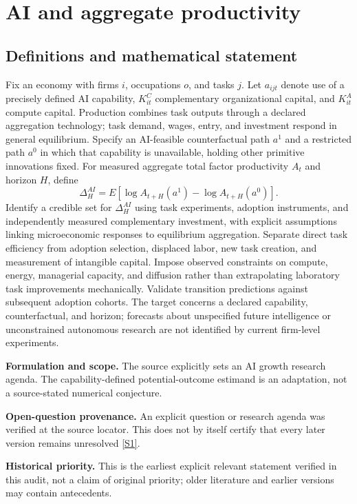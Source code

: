 \documentclass[11pt]{article}
\newcommand{\sref}[2]{\hyperlink{source:#1:#2}{[S#2]}}
\begin{document}
\section*{AI and aggregate productivity}\label{30007544}
\subsection{Definitions and mathematical statement}
Fix an economy with firms \(i\), occupations \(o\), and tasks \(j\). Let \(a_{ijt}\) denote use of a precisely defined AI capability, \(K^C_{it}\) complementary organizational capital, and \(K^A_{it}\) compute capital. Production combines task outputs through a declared aggregation technology; task demand, wages, entry, and investment respond in general equilibrium. Specify an AI-feasible counterfactual path \(a^1\) and a restricted path \(a^0\) in which that capability is unavailable, holding other primitive innovations fixed.
For measured aggregate total factor productivity \(A_t\) and horizon \(H\), define
\[
\Delta_H^{AI}=E[\log A_{t+H}(a^1)-\log A_{t+H}(a^0)].
\]
Identify a credible set for \(\Delta_H^{AI}\) using task experiments, adoption instruments, and independently measured complementary investment, with explicit assumptions linking microeconomic responses to equilibrium aggregation. Separate direct task efficiency from adoption selection, displaced labor, new task creation, and measurement of intangible capital. Impose observed constraints on compute, energy, managerial capacity, and diffusion rather than extrapolating laboratory task improvements mechanically. Validate transition predictions against subsequent adoption cohorts. The target concerns a declared capability, counterfactual, and horizon; forecasts about unspecified future intelligence or unconstrained autonomous research are not identified by current firm-level experiments.

\par\textbf{Formulation and scope.} The source explicitly sets an AI growth research agenda. The capability-defined potential-outcome estimand is an adaptation, not a source-stated numerical conjecture.

\par\textbf{Open-question provenance.} An explicit question or research agenda was verified at the source locator. This does not by itself certify that every later version remains unresolved \sref{30007544}{1}.

\par\textbf{Historical priority.} This is the earliest explicit relevant statement verified in this audit, not a claim of original priority; older literature and earlier versions may contain antecedents.
\end{document}
